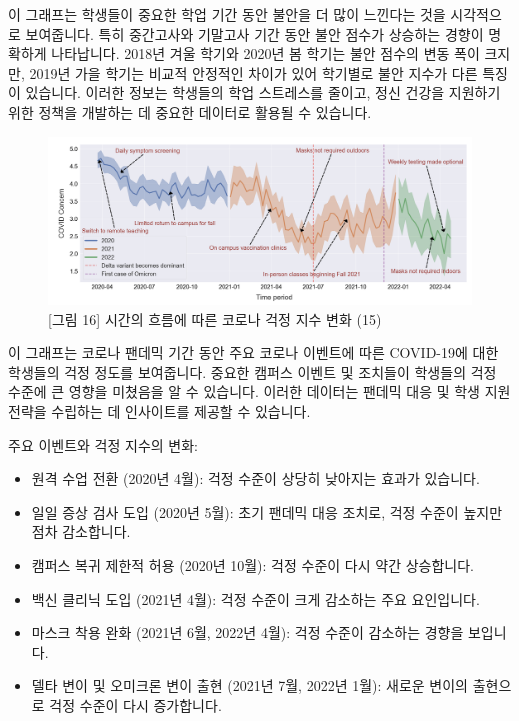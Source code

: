 \documentclass[
  letterpaper,
]{book}
\providecommand{\tightlist}{%
  \setlength{\itemsep}{0pt}\setlength{\parskip}{0pt}}\usepackage{longtable,booktabs,array}
\begin{document}
이 그래프는 학생들이 중요한 학업 기간 동안 불안을 더 많이 느낀다는 것을
시각적으로 보여줍니다. 특히 중간고사와 기말고사 기간 동안 불안 점수가
상승하는 경향이 명확하게 나타납니다. 2018년 겨울 학기와 2020년 봄 학기는
불안 점수의 변동 폭이 크지만, 2019년 가을 학기는 비교적 안정적인 차이가
있어 학기별로 불안 지수가 다른 특징이 있습니다. 이러한 정보는 학생들의
학업 스트레스를 줄이고, 정신 건강을 지원하기 위한 정책을 개발하는 데
중요한 데이터로 활용될 수 있습니다.

\begin{figure}[H]

{\centering \includegraphics{img/fig16.png}

}

\caption{{[}그림 16{]} 시간의 흐름에 따른 코로나 걱정 지수 변화 (15)}

\end{figure}%

이 그래프는 코로나 팬데믹 기간 동안 주요 코로나 이벤트에 따른 COVID-19에
대한 학생들의 걱정 정도를 보여줍니다. 중요한 캠퍼스 이벤트 및 조치들이
학생들의 걱정 수준에 큰 영향을 미쳤음을 알 수 있습니다. 이러한 데이터는
팬데믹 대응 및 학생 지원 전략을 수립하는 데 인사이트를 제공할 수
있습니다.

주요 이벤트와 걱정 지수의 변화:

\begin{itemize}
\tightlist
\item
  원격 수업 전환 (2020년 4월): 걱정 수준이 상당히 낮아지는 효과가
  있습니다.
\item
  일일 증상 검사 도입 (2020년 5월): 초기 팬데믹 대응 조치로, 걱정 수준이
  높지만 점차 감소합니다.
\item
  캠퍼스 복귀 제한적 허용 (2020년 10월): 걱정 수준이 다시 약간
  상승합니다.
\item
  백신 클리닉 도입 (2021년 4월): 걱정 수준이 크게 감소하는 주요
  요인입니다.
\item
  마스크 착용 완화 (2021년 6월, 2022년 4월): 걱정 수준이 감소하는 경향을
  보입니다.
\item
  델타 변이 및 오미크론 변이 출현 (2021년 7월, 2022년 1월): 새로운
  변이의 출현으로 걱정 수준이 다시 증가합니다.
\end{itemize}
\end{document}
